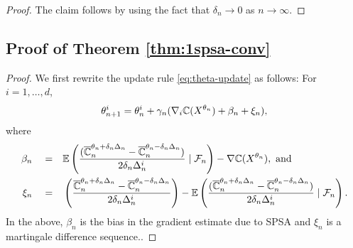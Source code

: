 \begin{proof}
The claim follows by using the fact that $\delta_n \rightarrow 0$ as $n\rightarrow \infty$.
\end{proof}

\subsection*{Proof of Theorem \ref{thm:1spsa-conv}}

\begin{proof}

We first rewrite the update rule \eqref{eq:theta-update} as follows: For $i=1,\ldots,d$,
\begin{align}
\theta^{i}_{n+1}  =  \theta^{i}_n +  \gamma_n(\nabla_{i} \mathbb{C}(X^{\theta_n}) + \beta_n + \xi_n), 
\label{eq:1spsa-equiv}
\end{align}
where 
\begin{align*}
\beta_n \quad= &\quad \mathbb{E}\left(\dfrac{(\overline {\mathbb{C}}_n^{\theta_n + \delta_n \Delta_n} -\overline {\mathbb{C}}_n^{\theta_n - \delta_n \Delta_n})}{2 \delta_n \Delta_n^{i}} \mid \mathcal{F}_n \right) - \nabla \mathbb{C}(X^{\theta_n}), \text{ and}\\
\xi_n \quad = & \quad\left(\dfrac{\overline {\mathbb{C}}_n^{\theta_n + \delta_n \Delta_n} -\overline {\mathbb{C}}_n^{\theta_n - \delta_n \Delta_n}}{2 \delta_n\Delta_n^{i}}\right)  - \mathbb{E}\left(\dfrac{(\overline {\mathbb{C}}_n^{\theta_n + \delta_n \Delta_n} -\overline {\mathbb{C}}_n^{\theta_n - \delta_n \Delta_n})}{2 \delta_n \Delta_n^{i}}\mid \mathcal{F}_n \right).
\end{align*}
In the above, $\beta_n$ is the bias in the gradient estimate due to SPSA and $\xi_n$ is a martingale difference sequence..


\end{proof}

